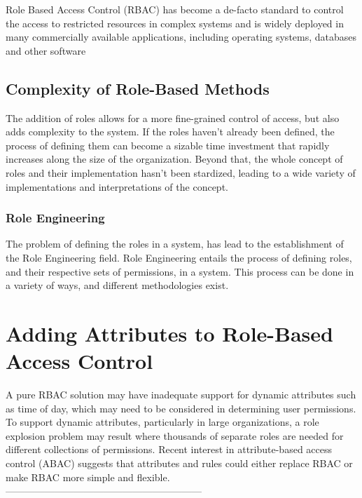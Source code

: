 Role Based Access Control (RBAC) has become a de-facto standard to control the access to restricted resources in complex systems and is widely deployed in many commercially available applications, including operating systems, databases and other software

\subsection{Complexity of Role-Based Methods}
The addition of roles allows for a more fine-grained control of access, but also adds complexity to the system. If the roles haven't already been defined, the process of defining them can become a sizable time investment that rapidly increases along the size of the organization\citep{FormNormRBAC2009}. Beyond that, the whole concept of roles and their implementation hasn't been stardized, leading to a wide variety of implementations and interpretations of the concept\citep{RolesInInfoSec2011}.

\subsubsection{Role Engineering}
The problem of defining the roles in a system, has lead to the establishment of the Role Engineering field\citep{RoleEngMethStd}. Role Engineering entails the process of defining roles, and their respective sets of permissions, in a system. This process can be done in a variety of ways, and different methodologies exist\citep{RoleEngMethStd}.




\section{Adding Attributes to Role-Based Access Control}
A pure RBAC solution may have inadequate support for dynamic attributes such as time of day, which may need to be considered in determining user permissions. To support dynamic attributes, particularly in large organizations, a role explosion problem may result where thousands of separate roles are needed for different collections of permissions. Recent interest in attribute-based access control (ABAC) suggests that attributes and rules could either replace RBAC or make RBAC more simple and flexible.
------------------------------------------------------------


